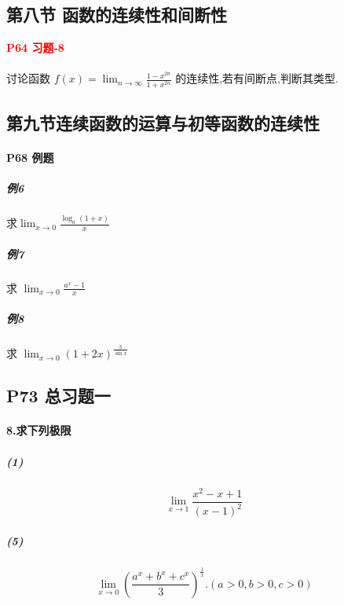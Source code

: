 \documentclass[a4paper]{article}
\begin{document}
\subsection{第八节 \quad  函数的连续性和间断性}
\textcolor{red}{\textbf{P64 \quad 习题-8}}
\paragraph{}
讨论函数 $f(x) = \lim_{n \rightarrow \infty} { \frac{1 - x^{2n}} {1 + x^{2n}} }$ 的连续性,若有间断点,判断其类型.

\subsection{第九节\quad 连续函数的运算与初等函数的连续性}
\paragraph{P68 \quad 例题}
\subparagraph{例6}
求$\lim_{x \rightarrow 0}
     {
         \frac{
             \log_{a}{(1+x)}
            }{x}
     }$

\subparagraph{例7}
求 $\lim_{x \rightarrow 0}
     {
         \frac{a^x - 1}{x}
     }$

\subparagraph{例8}
求 $\lim_{x \rightarrow 0}
     {
         (1 + 2x)^{\frac{3}{\sin{x}}}
     }$


\subsection{P73 总习题一}
\paragraph{8.求下列极限}
\subparagraph{(1)}
$$
\lim_{x \rightarrow 1}
     {
         \frac{x^2 - x + 1}
              {(x-1)^2}
         }
$$

\subparagraph{(5)}
$$
\lim_{x \rightarrow 0}
     {
         (
            \frac{a^x + b^x + c^x}
                 {3}
         )^ {\frac{1}{x}}
     }.
     (a>0,b>0,c>0)
$$


\end{document}
